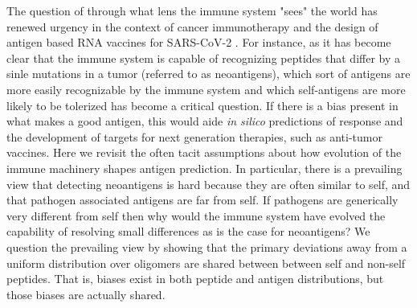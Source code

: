 \documentclass[superscriptaddress,twocolumn,pre]{revtex4}
\newcommand{\<}{\langle}
\renewcommand{\>}{\rangle}
\begin{document}
The question of through what lens the immune system "sees" the world has renewed urgency in the context of cancer immunotherapy and the design of antigen based RNA vaccines for SARS-CoV-2 \cite{Luksza2017,Balachandran2017,Richman2019}. For instance, as it has become clear that the immune system is capable of recognizing peptides that differ by a sinle mutations in a tumor (referred to as neoantigens), which sort of antigens are more easily recognizable by the immune system and which self-antigens are more likely to be tolerized has become a critical question. If there is a bias present in what makes a good antigen, this would aide {\it in silico} predictions of response and the development of targets for next generation therapies, such as anti-tumor vaccines. Here we revisit the often tacit assumptions about how evolution of the immune machinery shapes antigen prediction. In particular, there is a prevailing view that detecting neoantigens is hard because they are often similar to self, and that pathogen associated antigens are far from self. If pathogens are generically very different from self then why would the immune system have evolved the capability of resolving small differences as is the case for neoantigens? We question the prevailing view by showing that the primary deviations away from a uniform distribution over oligomers are shared between between self and non-self peptides. That is, biases exist in both peptide and antigen distributions, but those biases are actually shared. 
\end{document}
